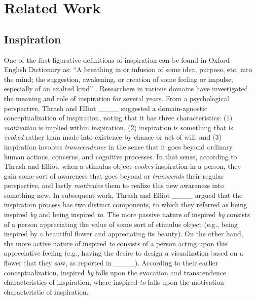 \section{Related Work}
\label{background}
\subsection{Inspiration}
One of the first figurative definitions of inspiration can be found in Oxford English Dictionary as: ``A breathing in or infusion of some idea, purpose, etc. into the mind; the suggestion, awakening, or creation of some feeling or impulse, especially of an exalted kind'' \cite[p. 1036]{simpson_oxford_1989}. Researchers in various domains have investigated the meaning and role of inspiration for several years. From a psychological perspective, Thrash and Elliot ____ suggested a domain-agnostic conceptualization of inspiration, noting that it has three characteristics: (1) \textit{motivation} is implied within inspiration, (2) inspiration is something that is \textit{evoked} rather than made into existence by chance or act of will, and (3) inspiration involves \textit{transcendence} in the sense that it goes beyond ordinary human actions, concerns, and cognitive processes. In that sense, according to Thrash and Elliot, when a stimulus object \textit{evokes} inspiration in a person, they gain some sort of awareness that goes beyond or \textit{transcends} their regular perspective, and lastly \textit{motivates} them to realize this new awareness into something new. In subsequent work, Thrash and Elliot ____ argued that the inspiration process has two distinct components, to which they referred as being inspired \textit{by} and being inspired \textit{to}. The more passive nature of inspired \textit{by} consists of a person appreciating the value of some sort of stimulus object (e.g., being inspired by a beautiful flower and appreciating its beauty). On the other hand, the more active nature of inspired \textit{to} consists of a person acting upon this appreciative feeling (e.g., having the desire to design a visualization based on a flower that they saw, as reported in ____). According to their earlier conceptualization, inspired \textit{by} falls upon the evocation and transcendence characteristics of inspiration, where inspired \textit{to} falls upon the motivation characteristic of inspiration. 

